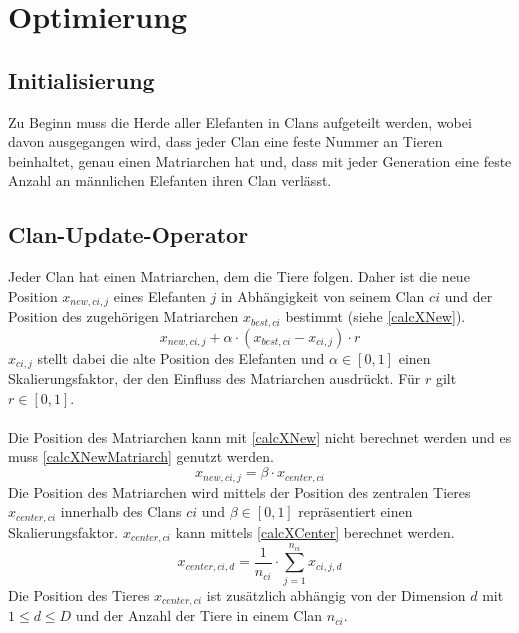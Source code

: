 \chapter{Optimierung}
\section{Initialisierung}
Zu Beginn muss die Herde aller Elefanten in Clans aufgeteilt werden, wobei davon ausgegangen wird, dass jeder Clan eine feste Nummer an Tieren beinhaltet, genau einen Matriarchen hat und, dass mit jeder Generation eine feste Anzahl an männlichen Elefanten ihren Clan verlässt. 

\section{Clan-Update-Operator}
Jeder Clan hat einen Matriarchen, dem die Tiere folgen. Daher ist die neue Position $x_{new, ci, j}$ eines Elefanten $j$ in Abhängigkeit von seinem Clan $ci$ und der Position des zugehörigen Matriarchen $x_{best, ci}$ bestimmt (siehe \autoref{calcXNew}). 
\begin{equation}
    x_{new, ci, j} + \alpha \cdot (x_{best, ci} - x_{ci, j}) \cdot r
    \label{calcXNew}
\end{equation}
$x_{ci, j}$ stellt dabei die alte Position des Elefanten und $\alpha \in [0,1]$ einen Skalierungsfaktor, der den Einfluss des Matriarchen ausdrückt. Für $r$ gilt $r \in [0,1]$.\\
\\
Die Position des Matriarchen kann mit \autoref{calcXNew} nicht berechnet werden und es muss \autoref{calcXNewMatriarch} genutzt werden.
\begin{equation}
    x_{new, ci, j} = \beta \cdot x_{center, ci}
    \label{calcXNewMatriarch}
\end{equation}
Die Position des Matriarchen wird mittels der Position des zentralen Tieres $x_{center, ci}$ innerhalb des Clans $ci$ und $\beta \in [0,1]$ repräsentiert einen Skalierungsfaktor. $x_{center, ci}$ kann mittels \autoref{calcXCenter} berechnet werden.
\begin{equation}
    x_{center, ci, d} = \frac{1}{n_{ci}} \cdot \sum_{j=1}^{n_{ci}} x_{ci,j,d}
    \label{calcXCenter}
\end{equation}
Die Position des Tieres $x_{center, ci}$ ist zusätzlich abhängig von der Dimension $d$ mit $1 \leq d \leq D$ und der Anzahl der Tiere in einem Clan $n_{ci}$.

